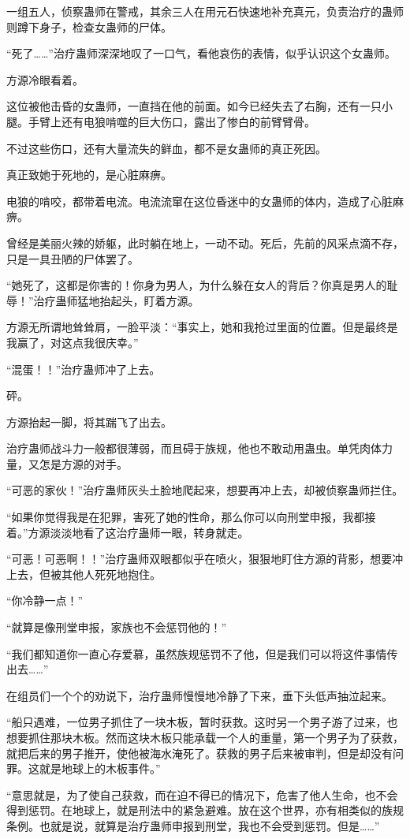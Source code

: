 \begin{this_body}
一组五人，侦察蛊师在警戒，其余三人在用元石快速地补充真元，负责治疗的蛊师则蹲下身子，检查女蛊师的尸体。

“死了……”治疗蛊师深深地叹了一口气，看他哀伤的表情，似乎认识这个女蛊师。

方源冷眼看着。

这位被他击昏的女蛊师，一直挡在他的前面。如今已经失去了右胸，还有一只小腿。手臂上还有电狼啃噬的巨大伤口，露出了惨白的前臂臂骨。

不过这些伤口，还有大量流失的鲜血，都不是女蛊师的真正死因。

真正致她于死地的，是心脏麻痹。

电狼的啃咬，都带着电流。电流流窜在这位昏迷中的女蛊师的体内，造成了心脏麻痹。

曾经是美丽火辣的娇躯，此时躺在地上，一动不动。死后，先前的风采点滴不存，只是一具丑陋的尸体罢了。

“她死了，这都是你害的！你身为男人，为什么躲在女人的背后？你真是男人的耻辱！”治疗蛊师猛地抬起头，盯着方源。

方源无所谓地耸耸肩，一脸平淡：“事实上，她和我抢过里面的位置。但是最终是我赢了，对这点我很庆幸。”

“混蛋！！”治疗蛊师冲了上去。

砰。

方源抬起一脚，将其踹飞了出去。

治疗蛊师战斗力一般都很薄弱，而且碍于族规，他也不敢动用蛊虫。单凭肉体力量，又怎是方源的对手。

“可恶的家伙！”治疗蛊师灰头土脸地爬起来，想要再冲上去，却被侦察蛊师拦住。

“如果你觉得我是在犯罪，害死了她的性命，那么你可以向刑堂申报，我都接着。”方源淡淡地看了这治疗蛊师一眼，转身就走。

“可恶！可恶啊！！”治疗蛊师双眼都似乎在喷火，狠狠地盯住方源的背影，想要冲上去，但被其他人死死地抱住。

“你冷静一点！”

“就算是像刑堂申报，家族也不会惩罚他的！”

“我们都知道你一直心存爱慕，虽然族规惩罚不了他，但是我们可以将这件事情传出去……”

在组员们一个个的劝说下，治疗蛊师慢慢地冷静了下来，垂下头低声抽泣起来。

“船只遇难，一位男子抓住了一块木板，暂时获救。这时另一个男子游了过来，也想要抓住那块木板。然而这块木板只能承载一个人的重量，第一个男子为了获救，就把后来的男子推开，使他被海水淹死了。获救的男子后来被审判，但是却没有问罪。这就是地球上的木板事件。”

“意思就是，为了使自己获救，而在迫不得已的情况下，危害了他人生命，也不会得到惩罚。在地球上，就是刑法中的紧急避难。放在这个世界，亦有相类似的族规条例。也就是说，就算是治疗蛊师申报到刑堂，我也不会受到惩罚。但是……”


\end{this_body}
